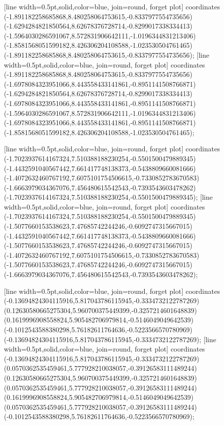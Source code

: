 [line width=0.5pt,solid,color=blue, join=round, forget plot] coordinates {(-1.891182258685868,8.480258064753615,-0.8337977554735656) (-1.6294284821850564,8.62678376728714,-0.8299017338334413) (-1.5964030286591067,8.572831906642111,-1.0196344831213406) (-1.8581568051599182,8.426306204108588,-1.023530504761465) (-1.891182258685868,8.480258064753615,-0.8337977554735656)};
[line width=0.5pt,solid,color=blue, join=round, forget plot] coordinates {(-1.891182258685868,8.480258064753615,-0.8337977554735656) (-1.6978084323951066,8.443558433141861,-0.8951141508766871) (-1.6294284821850564,8.62678376728714,-0.8299017338334413) (-1.6978084323951066,8.443558433141861,-0.8951141508766871) (-1.5964030286591067,8.572831906642111,-1.0196344831213406) (-1.6978084323951066,8.443558433141861,-0.8951141508766871) (-1.8581568051599182,8.426306204108588,-1.023530504761465)};

[line width=0.5pt,solid,color=blue, join=round, forget plot] coordinates {(-1.7023937614167324,7.510388188230254,-0.5501500479889345) (-1.4432591040567442,7.661417748138373,-0.5438809660081666) (-1.4072632460767192,7.6075101754506615,-0.7330852783670583) (-1.6663979034367076,7.456480615542543,-0.7393543603478262) (-1.7023937614167324,7.510388188230254,-0.5501500479889345)};
[line width=0.5pt,solid,color=blue, join=round, forget plot] coordinates {(-1.7023937614167324,7.510388188230254,-0.5501500479889345) (-1.5077660153538623,7.47685742244246,-0.6092747315667015) (-1.4432591040567442,7.661417748138373,-0.5438809660081666) (-1.5077660153538623,7.47685742244246,-0.6092747315667015) (-1.4072632460767192,7.6075101754506615,-0.7330852783670583) (-1.5077660153538623,7.47685742244246,-0.6092747315667015) (-1.6663979034367076,7.456480615542543,-0.7393543603478262)};

[line width=0.5pt,solid,color=blue, join=round, forget plot] coordinates {(-0.13694824304115916,5.817043786115945,-0.3334732122787269) (0.12630580665275304,5.960700375449399,-0.3257214601648839) (0.1619996908558824,5.905482706979814,-0.5146049049642539) (-0.1012543588380298,5.76182611764636,-0.5223566570780969) (-0.13694824304115916,5.817043786115945,-0.3334732122787269)};
[line width=0.5pt,solid,color=blue, join=round, forget plot] coordinates {(-0.13694824304115916,5.817043786115945,-0.3334732122787269) (0.0570362535459461,5.777928210038057,-0.39126583111489244) (0.12630580665275304,5.960700375449399,-0.3257214601648839) (0.0570362535459461,5.777928210038057,-0.39126583111489244) (0.1619996908558824,5.905482706979814,-0.5146049049642539) (0.0570362535459461,5.777928210038057,-0.39126583111489244) (-0.1012543588380298,5.76182611764636,-0.5223566570780969)};

